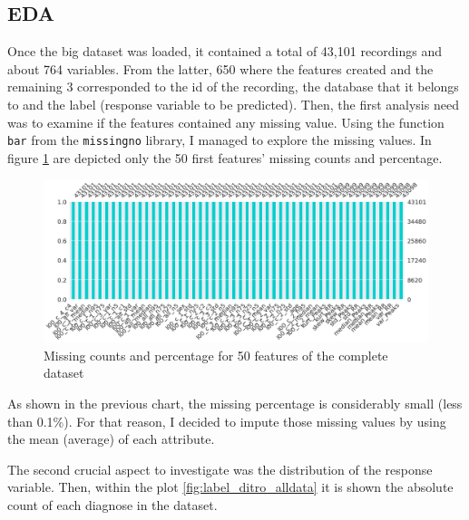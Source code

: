 \subsection{EDA}

Once the big dataset was loaded, it contained a total of 43,101 recordings and about 764 variables. From the latter, 650 where the features created and the remaining 3 corresponded to the id of the recording, the database that it belongs to and the label (response variable to be predicted). Then, the first analysis need was to examine if the features contained any missing value. Using the function \texttt{bar} from the \texttt{missingno} library, I managed to explore the missing values. In figure \ref{fig:eda_missing} are depicted only the 50 first features' missing counts and percentage.

\begin{figure}[H]
\centering
\includegraphics[scale=0.32]{img/eda_missing.png}
\caption{Missing counts and percentage for 50 features of the complete dataset}
\label{fig:eda_missing}
\end{figure}

As shown in the previous chart, the missing percentage is considerably small (less than 0.1\%). For that reason, I decided to impute those missing values by using the mean (average) of each attribute. 

The second crucial aspect to investigate was the distribution of the response variable. Then, within the plot \ref{fig:label_ditro_alldata} it is shown the absolute count of each diagnose in the dataset.

